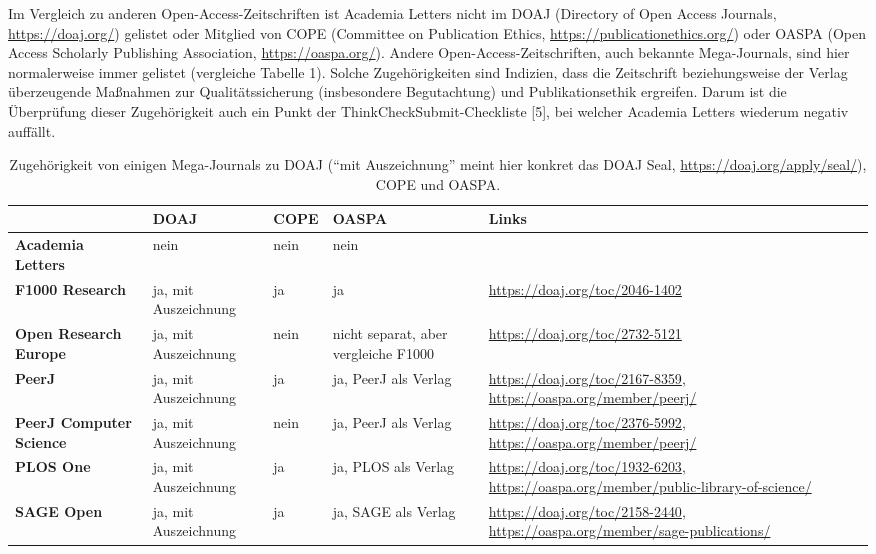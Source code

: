 \documentclass[a4paper,
fontsize=11pt,
oneside,
numbers=noperiodatend,
parskip=half-,
bibliography=totoc,
final
]{scrartcl}
\begin{document}
Im Vergleich zu anderen Open-Access-Zeitschriften ist Academia Letters
nicht im DOAJ (Directory of Open Access Journals,
\url{https://doaj.org/}) gelistet oder Mitglied von COPE (Committee on
Publication Ethics, \url{https://publicationethics.org/}) oder OASPA
(Open Access Scholarly Publishing Association,
\url{https://oaspa.org/}). Andere Open-Access-Zeitschriften, auch
bekannte Mega-Journals, sind hier normalerweise immer gelistet
(vergleiche Tabelle 1). Solche Zugehörigkeiten sind Indizien, dass die
Zeitschrift beziehungsweise der Verlag überzeugende Maßnahmen zur
Qualitätssicherung (insbesondere Begutachtung) und Publikationsethik
ergreifen. Darum ist die Überprüfung dieser Zugehörigkeit auch ein Punkt
der ThinkCheckSubmit-Checkliste {[}5{]}, bei welcher Academia Letters
wiederum negativ auffällt.

\begin{table}[!ht]
    \centering
                \caption{Zugehörigkeit von einigen Mega-Journals zu DOAJ (\enquote{mit Auszeichnung} meint hier konkret das DOAJ Seal, \url{https://doaj.org/apply/seal/}), COPE und OASPA.} \vspace*{1em}
    \begin{tabular}{p{3cm}p{2cm}lp{2cm}p{5.7cm}}
    \toprule
        \textbf{~} & \textbf{DOAJ} & \textbf{COPE} & \textbf{OASPA} & \textbf{Links} \\
        \midrule
\textbf{Academia Letters} & nein & nein & nein & ~ \\
\midrule
\textbf{F1000 Research} & ja, mit Auszeichnung & ja & ja & \url{https://doaj.org/toc/2046-1402} \\
\midrule
\textbf{Open Research Europe} & ja, mit Auszeichnung & nein & nicht separat, aber vergleiche F1000 & \url{https://doaj.org/toc/2732-5121} \\
\midrule
\textbf{PeerJ} & ja, mit Auszeichnung & ja & ja, PeerJ als Verlag & \url{https://doaj.org/toc/2167-8359}, \url{https://oaspa.org/member/peerj/} \\
\midrule
\textbf{PeerJ Computer Science} & ja, mit Auszeichnung & nein & ja, PeerJ als Verlag & \url{https://doaj.org/toc/2376-5992}, \url{https://oaspa.org/member/peerj/} \\
\midrule
\textbf{PLOS One} & ja, mit Auszeichnung & ja & ja, PLOS als Verlag & \url{https://doaj.org/toc/1932-6203}, \url{https://oaspa.org/member/public-library-of-science/} \\
\midrule
\textbf{SAGE Open} & ja, mit Auszeichnung & ja & ja, SAGE als Verlag & \url{https://doaj.org/toc/2158-2440}, \url{https://oaspa.org/member/sage-publications/} \\
        \bottomrule
            \end{tabular}
\end{table}
\end{document}
